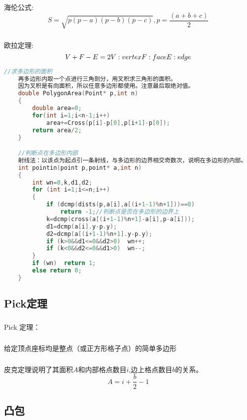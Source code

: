 \documentclass[]{article}
\begin{document}
\subparagraph{}
海伦公式:
$$
S = \sqrt{p(p - a)(p - b)(p - c)}, p = \frac{(a + b + c)}{2}
$$
\subparagraph{}
欧拉定理:
$$
V+F-E=2  \\  
V:vertex  \\  
F:face  \\  
E:edge  \\  
$$
\begin{lstlisting}[language={c}]
    //求多边形的面积
    再多边形内取一个点进行三角剖分，用叉积求三角形的面积。
    因为叉积是有向面积，所以任意多边形都使用。注意最后取绝对值。
    double PolygonArea(Point* p,int n)
    {
        double area=0;
        for(int i=1;i<n-1;i++)
            area+=Cross(p[i]-p[0],p[i+1]-p[0]);
        return area/2;
    }

    //判断点在多边形内部
    射线法：以该点为起点引一条射线，与多边形的边界相交奇数次，说明在多边形的内部。
    int pointin(point p,point* a,int n)   
    {  
        int wn=0,k,d1,d2;  
        for (int i=1;i<=n;i++)  
        {  
            if (dcmp(dists(p,a[i],a[(i+1-1)%n+1]))==0)
                return -1;//判断点是否在多边形的边界上   
            k=dcmp(cross(a[(i+1-1)%n+1]-a[i],p-a[i]));  
            d1=dcmp(a[i].y-p.y);  
            d2=dcmp(a[(i+1-1)%n+1].y-p.y);  
            if (k>0&&d1<=0&&d2>0)  wn++;  
            if (k<0&&d2<=0&&d1>0)  wn--;  
        }  
        if (wn)  return 1;  
        else return 0;  
    }
\end{lstlisting}

\subsection{Pick定理}
\subparagraph{}
Pick 定理：
\subparagraph{}
给定顶点座标均是整点（或正方形格子点）的简单多边形
\subparagraph{}
皮克定理说明了其面积$A$和内部格点数目$i$,边上格点数目$b$的关系。
$$
A=i+\frac{b}{2}-1
$$


\subsection{凸包}
\end{document}
